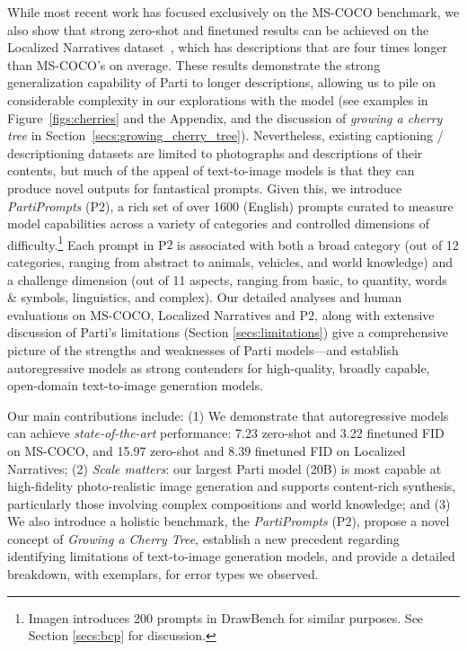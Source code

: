 While most recent work has focused exclusively on the MS-COCO benchmark, we also show that strong zero-shot and finetuned results can be achieved on the Localized Narratives dataset~\cite{PontTuset_eccv2020}, which has descriptions that are four times longer than MS-COCO's on average. These results demonstrate the strong generalization capability of Parti to longer descriptions, allowing us to pile on considerable complexity in our explorations with the model (see examples in Figure~\ref{figs:cherries} and the Appendix, and the discussion of \textit{growing a cherry tree} in Section~\ref{secs:growing_cherry_tree}). Nevertheless, existing captioning / descriptioning datasets are limited to photographs and descriptions of their contents, but much of the appeal of text-to-image models is that they can produce novel outputs for fantastical prompts. Given this, we introduce {\it PartiPrompts} (P$2$), a rich set of over 1600 (English) prompts curated to measure model capabilities across a variety of categories and controlled dimensions of difficulty.\footnote{Imagen \cite{imagen} introduces 200 prompts in DrawBench for similar purposes. See Section \ref{secs:bcp} for discussion.} Each prompt in P$2$ is associated with both a broad category (out of 12 categories, ranging from abstract to animals, vehicles, and world knowledge) and a challenge dimension (out of 11 aspects, ranging from basic, to quantity, words \& symbols, linguistics, and complex). Our detailed analyses and human evaluations on MS-COCO, Localized Narratives and P$2$, along with extensive discussion of Parti's limitations (Section \ref{secs:limitations}) give a comprehensive picture of the strengths and weaknesses of Parti models---and establish autoregressive models as strong contenders for high-quality, broadly capable, open-domain text-to-image generation models.

Our main contributions include: (1) We demonstrate that autoregressive models can achieve {\it state-of-the-art} performance: 7.23 zero-shot and 3.22 finetuned FID on MS-COCO, and 15.97 zero-shot and 8.39 finetuned FID on Localized Narratives; (2) {\it Scale matters}: our largest Parti model (20B) is most capable at high-fidelity photo-realistic image generation and supports content-rich synthesis, particularly those involving complex compositions and world knowledge; and (3) We also introduce a holistic benchmark, the {\it PartiPrompts} (P$2$), propose a novel concept of {\it Growing a Cherry Tree}, establish a new precedent regarding identifying limitations of text-to-image generation models, and provide a detailed breakdown, with exemplars, for error types we observed.

